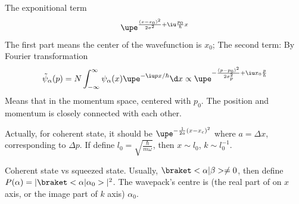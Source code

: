 \begin{solution}[By TA]
\begin{enumext}
    The exponitional term
    \[
      \upe^{\frac{(x - x_0)^2}{2\sigma^2} + \iu\frac{p_0}{\hbar}x}
    \]
    The first part means the center of the wavefunction is $x_0$;
    The second term: By Fourier transformation
    \[
      \tilde\psi_\alpha(p)
    = N \int_{-\infty}^\infty \psi_\alpha(x) \upe^{-\iu px/\hbar} \d x
    \propto \upe^{-\frac{(p-p_0)^2}{2\sigma_p^2} + \iu x_0 \frac p\hbar}
    \]
    Means that in the momentum space, centered with $p_0$.
    The position and momentum is closely connected with each other.

    Actually, for coherent state,
    it should be $\upe^{-\frac1{2a}(x - x_c)^2}$ where $a = \Delta x$,
    corresponding to $\Delta p$.
    If define $l_0 = \sqrt{\frac\hbar{m\omega}}$, then $x \sim l_0$,
    $k\sim l_0^{-1}$.
    
    Coherent state vs squeezed state.
    Usually, $\braket<\alpha|\beta> \neq 0$, then define
    $P(\alpha) = |\braket<\alpha|\alpha_0>|^2$.
    The wavepack's centre is (the real part of on $x$ axis,
    or the image part of $k$ axis) $\alpha_0$.
  \end{enumext}
\end{solution}
\begin{problem}
\end{problem}
